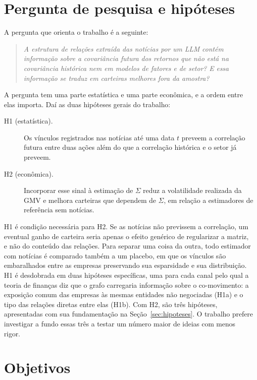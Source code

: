 \section{Pergunta de pesquisa e hipóteses}
\label{sec:pergunta}

A pergunta que orienta o trabalho é a seguinte:

\begin{quote}
\emph{A estrutura de relações extraída das notícias por um LLM contém informação sobre a covariância
futura dos retornos que não está na covariância histórica nem em modelos de fatores e de setor? E essa
informação se traduz em carteiras melhores fora da amostra?}
\end{quote}

A pergunta tem uma parte estatística e uma parte econômica, e a ordem entre elas importa. Daí as duas
hipóteses gerais do trabalho:

\begin{description}
  \item[H1 (estatística).] Os vínculos registrados nas notícias até uma data $t$ preveem a correlação
        futura entre duas ações além do que a correlação histórica e o setor já preveem.
  \item[H2 (econômica).] Incorporar esse sinal à estimação de $\Sigma$ reduz a volatilidade realizada
        da GMV e melhora carteiras que dependem de $\Sigma$, em relação a estimadores de referência
        sem notícias.
\end{description}

H1 é condição necessária para H2. Se as notícias não previssem a correlação, um eventual ganho de
carteira seria apenas o efeito genérico de regularizar a matriz, e não do conteúdo das relações. Para
separar uma coisa da outra, todo estimador com notícias é comparado também a um placebo, em que os
vínculos são embaralhados entre as empresas preservando sua esparsidade e sua distribuição. H1 é desdobrada
em duas hipóteses específicas, uma para cada canal pelo qual a teoria de finanças diz que o grafo
carregaria informação sobre o co-movimento: a exposição comum das empresas às mesmas entidades não
negociadas (H1a) e o tipo das relações diretas entre elas (H1b). Com H2, são três hipóteses, apresentadas
com sua fundamentação na Seção~\ref{sec:hipoteses}. O trabalho prefere investigar a fundo essas três a
testar um número maior de ideias com menos rigor.

\section{Objetivos}
\label{sec:objetivos}


